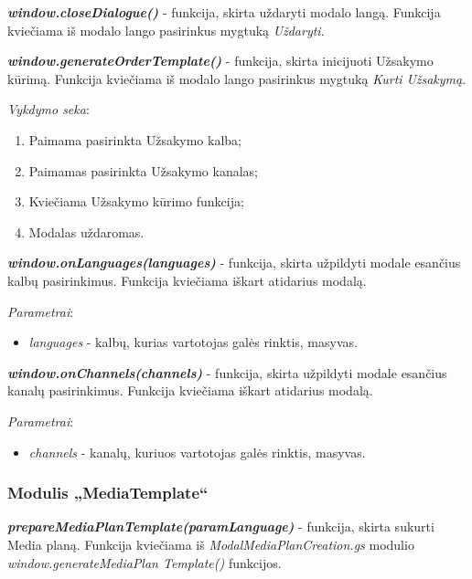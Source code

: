 \textit{\textbf{window.closeDialogue()}} - funkcija, skirta uždaryti modalo langą. Funkcija kviečiama iš modalo lango pasirinkus mygtuką \textit{Uždaryti}.

\bigskip
\textit{\textbf{window.generateOrderTemplate()}} - funkcija, skirta inicijuoti Užsakymo kūrimą. Funkcija kviečiama iš modalo lango pasirinkus mygtuką \textit{Kurti Užsakymą}.

\bigskip
\textit{Vykdymo seka}:
\begin{enumerate}
    \itemsep0em 
    \item Paimama pasirinkta Užsakymo kalba;
    \item Paimamas pasirinkta Užsakymo kanalas;
    \item Kviečiama Užsakymo kūrimo funkcija;
    \item Modalas uždaromas.
\end{enumerate}

\textit{\textbf{window.onLanguages(languages)}} - funkcija, skirta užpildyti modale esančius kalbų pasirinkimus. Funkcija kviečiama iškart atidarius modalą.

\bigskip
\textit{Parametrai}:
\begin{itemize}
    \itemsep0em 
    \item \textit{languages} - kalbų, kurias vartotojas galės rinktis, masyvas.
\end{itemize}

\bigskip
\textit{\textbf{window.onChannels(channels)}} - funkcija, skirta užpildyti modale esančius kanalų pasirinkimus. Funkcija kviečiama iškart atidarius modalą.

\bigskip
\textit{Parametrai}:
\begin{itemize}
    \itemsep0em 
    \item \textit{channels} - kanalų, kuriuos vartotojas galės rinktis, masyvas.
\end{itemize}



\subsubsection{Modulis „MediaTemplate“}

\textit{\textbf{prepareMediaPlanTemplate(paramLanguage)}} - funkcija, skirta sukurti Media planą. Funkcija kviečiama iš \textit{ModalMediaPlanCreation.gs} modulio \textit{window.generateMediaPlan Template()} funkcijos.

